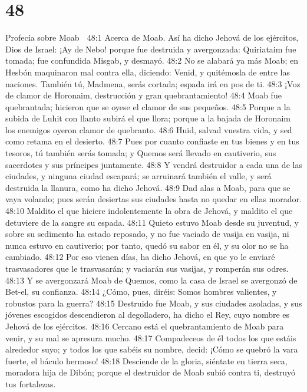 \chapter{48}

Profecía sobre Moab  

48:1 Acerca de Moab. Así ha dicho Jehová de los ejércitos, Dios de Israel: ¡Ay de Nebo! porque fue destruida y avergonzada: Quiriataim fue tomada; fue confundida Misgab, y desmayó.  
48:2 No se alabará ya más Moab; en Hesbón maquinaron mal contra ella, diciendo: Venid, y quitémosla de entre las naciones. También tú, Madmena, serás cortada; espada irá en pos de ti.  
48:3 ¡Voz de clamor de Horonaim, destrucción y gran quebrantamiento! 
48:4 Moab fue quebrantada; hicieron que se oyese el clamor de sus pequeños.  
48:5 Porque a la subida de Luhit con llanto subirá el que llora; porque a la bajada de Horonaim los enemigos oyeron clamor de quebranto.  
48:6 Huid, salvad vuestra vida, y sed como retama en el desierto.  
48:7 Pues por cuanto confiaste en tus bienes y en tus tesoros, tú también serás tomada; y Quemos será llevado en cautiverio, sus sacerdotes y sus príncipes juntamente.  
48:8 Y vendrá destruidor a cada una de las ciudades, y ninguna ciudad escapará; se arruinará también el valle, y será destruida la llanura, como ha dicho Jehová.  
48:9 Dad alas a Moab, para que se vaya volando; pues serán desiertas sus ciudades hasta no quedar en ellas morador.  
48:10 Maldito el que hiciere indolentemente la obra de Jehová, y maldito el que detuviere de la sangre su espada.  
48:11 Quieto estuvo Moab desde su juventud, y sobre su sedimento ha estado reposado, y no fue vaciado de vasija en vasija, ni nunca estuvo en cautiverio; por tanto, quedó su sabor en él, y su olor no se ha cambiado.  
48:12 Por eso vienen días, ha dicho Jehová, en que yo le enviaré trasvasadores que le trasvasarán; y vaciarán sus vasijas, y romperán sus odres.  
48:13 Y se avergonzará Moab de Quemos, como la casa de Israel se avergonzó de Bet-el, su confianza.  
48:14 ¿Cómo, pues, diréis: Somos hombres valientes, y robustos para la guerra?  
48:15 Destruido fue Moab, y sus ciudades asoladas, y sus jóvenes escogidos descendieron al degolladero, ha dicho el Rey, cuyo nombre es Jehová de los ejércitos.  
48:16 Cercano está el quebrantamiento de Moab para venir, y su mal se apresura mucho.  
48:17 Compadeceos de él todos los que estáis alrededor suyo; y todos los que sabéis su nombre, decid: ¡Cómo se quebró la vara fuerte, el báculo hermoso!  
48:18 Desciende de la gloria, siéntate en tierra seca, moradora hija de Dibón; porque el destruidor de Moab subió contra ti, destruyó tus fortalezas.  
